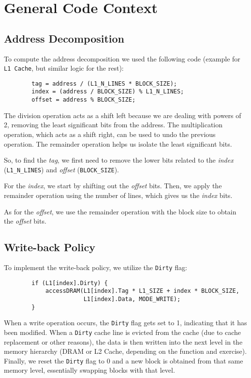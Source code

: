 \documentclass[12pt]{article}
\begin{document}
    \section{General Code Context}

    \subsection{Address Decomposition} \label{AD}
    To compute the address decomposition we used the following code (example for \texttt{L1 Cache}, but similar logic for the rest):

    \begin{verbatim}
        tag = address / (L1_N_LINES * BLOCK_SIZE);
        index = (address / BLOCK_SIZE) % L1_N_LINES;
        offset = address % BLOCK_SIZE;
    \end{verbatim}

    \vskip -0.3cm
    The division operation acts as a shift left because we are dealing with powers of 2, removing the least significant bits from the address.
    The multiplication operation, which acts as a shift right, can be used to undo the previous operation. The remainder operation helps
    us isolate the least significant bits.

    So, to find the \textit{tag}, we first need to remove the lower bits related to the \textit{index} (\texttt{L1\_N\_LINES}) and \textit{offset} (\texttt{BLOCK\_SIZE}).

    For the \textit{index}, we start by shifting out the \textit{offset} bits. Then, we apply the remainder operation using the number of lines,
    which gives us the \textit{index} bits.

    As for the \textit{offset}, we use the remainder operation with the block size to obtain the \textit{offset} bits.

    \subsection{Write-back Policy}
    To implement the write-back policy, we utilize the \texttt{Dirty} flag:

    \begin{verbatim}
        if (L1[index].Dirty) {
            accessDRAM(L1[index].Tag * L1_SIZE + index * BLOCK_SIZE,
                       L1[index].Data, MODE_WRITE);
        }
    \end{verbatim}

    \vskip -0.3cm
    When a write operation occurs, the \texttt{Dirty} flag gets set to 1, indicating that it has been modified.
    When a \texttt{Dirty} cache line is evicted from the cache (due to cache replacement or other reasons),
    the data is then written into the next level in the memory hierarchy (DRAM or L2 Cache, depending on the function and exercise).
    Finally, we reset the \texttt{Dirty} flag to 0 and a new block is obtained from that same memory level, essentially swapping blocks with that level.
\end{document}
